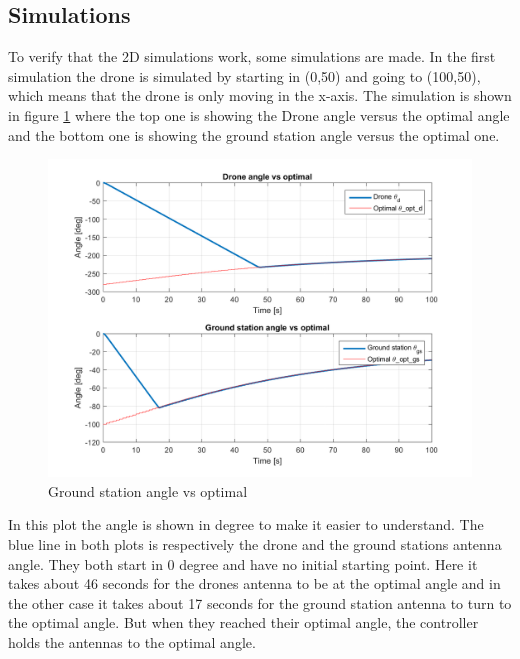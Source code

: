 \subsection{Simulations}
To verify that the 2D simulations work, some simulations are made. In the first simulation the drone is simulated by starting in (0,50) and going to (100,50), which means that the drone is only moving in the x-axis. The simulation is shown in figure \ref{fig:gs_angle_vs_optimal} where the top one is showing the Drone angle versus the optimal angle and the bottom one is showing the ground station angle versus the optimal one. 

\begin{figure}[h]
	\centering
	\includegraphics[scale=0.6]{figures/gs_angle_vs_optimal.png}
	\caption{Ground station angle vs optimal}
	\label{fig:gs_angle_vs_optimal}
\end{figure}

In this plot the angle is shown in degree to make it easier to understand. The blue line in both plots is respectively the drone and the ground stations antenna angle. They both start in 0 degree and have no initial starting point. Here it takes about 46 seconds for the drones antenna to be at the optimal angle and in the other case it takes about 17 seconds for the ground station antenna to turn to the optimal angle. But when they reached their optimal angle, the controller holds the antennas to the optimal angle. 
\newpage
